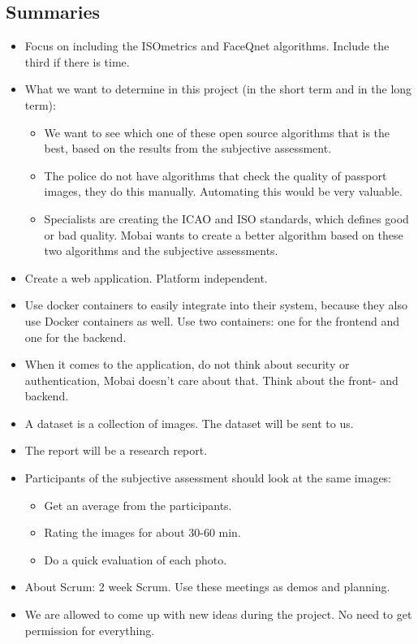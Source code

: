 \subsection*{Summaries}
\begin{itemize}
    \item Focus on including the ISOmetrics and FaceQnet algorithms. Include the third if there is time.
    \item What we want to determine in this project (in the short term and in the long term):
    \begin{itemize}
        \item We want to see which one of these open source algorithms that is the best, based on the results from the subjective assessment.
        \item The police do not have algorithms that check the quality of passport images, they do this manually. Automating this would be very valuable.
        \item Specialists are creating the ICAO and ISO standards, which defines good or bad quality. Mobai wants to create a better algorithm based on these two algorithms and the subjective assessments.
    \end{itemize}
    \item Create a web application. Platform independent.
    \item Use docker containers to easily integrate into their system, because they also use Docker containers as well. Use two containers: one for the frontend and one for the backend.
    \item When it comes to the application, do not think about security or authentication, Mobai doesn't care about that. Think about the front- and backend.
    \item A dataset is a collection of images. The dataset will be sent to us.
    \item The report will be a research report.
    \item Participants of the subjective assessment should look at the same images: 
    \begin{itemize}
        \item Get an average from the participants. 
        \item Rating the images for about 30-60 min.
        \item Do a quick evaluation of each photo. 
    \end{itemize}
    \item About Scrum: 2 week Scrum. Use these meetings as demos and planning.
    \item We are allowed to come up with new ideas during the project. No need to get permission for everything.
\end{itemize}

